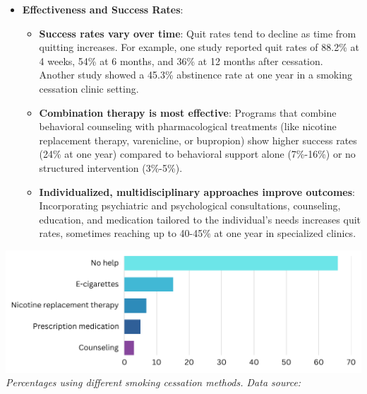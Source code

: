 \begin{itemize}
    \item \textbf{Effectiveness and Success Rates}:
        \begin{itemize}
            \item \textbf{Success rates vary over time}: Quit rates tend to decline as time from 
            quitting increases. For example, one study reported quit rates of 88.2\% at 4 weeks, 
            54\% at 6 months, and 36\% at 12 months after cessation.\cite{37297676} Another study 
            showed a 45.3\% abstinence rate at one year in a smoking cessation clinic setting.
            \cite{Esen2020}

            \item \textbf{Combination therapy is most effective}: Programs that combine behavioral 
            counseling with pharmacological treatments (like nicotine replacement therapy, 
            varenicline, or bupropion) show higher success rates (24\% at one year) compared to 
            behavioral support alone (7\%-16\%) or no structured intervention (3\%-5\%).\cite{cureus2024}

            \item \textbf{Individualized, multidisciplinary approaches improve outcomes}: 
            Incorporating psychiatric and psychological consultations, counseling, education, and 
            medication tailored to the individual’s needs increases quit rates, sometimes reaching 
            up to 40-45\% at one year in specialized clinics.\cite{37297676}
        \end{itemize}
\end{itemize}

\vspace{1em}
\begin{center}
    \includegraphics[width=\textwidth]{../assets/06-prevention/smoking-cessation.png}
    \small\textit{Percentages using different smoking cessation methods. Data source:\cite{who2018}}
\end{center}
\vspace{1em}

